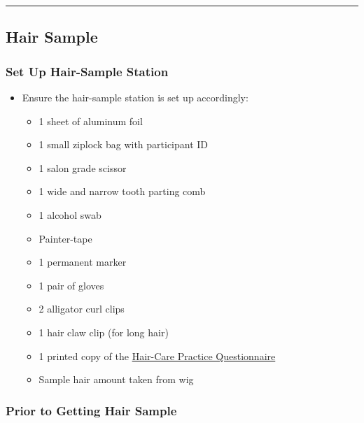 \documentclass[]{book}
\providecommand{\tightlist}{%
  \setlength{\itemsep}{0pt}\setlength{\parskip}{0pt}}
\begin{document}
\begin{center}\rule{0.5\linewidth}{0.5pt}\end{center}

\hypertarget{hair-sample}{%
\subsection{Hair Sample}\label{hair-sample}}

\hypertarget{set-up-hair-sample-station}{%
\subsubsection{Set Up Hair-Sample Station}\label{set-up-hair-sample-station}}

\begin{itemize}
\tightlist
\item
  Ensure the hair-sample station is set up accordingly:

  \begin{itemize}
  \tightlist
  \item
    1 sheet of aluminum foil
  \item
    1 small ziplock bag with participant ID
  \item
    1 salon grade scissor
  \item
    1 wide and narrow tooth parting comb
  \item
    1 alcohol swab
  \item
    Painter-tape
  \item
    1 permanent marker
  \item
    1 pair of gloves
  \item
    2 alligator curl clips
  \item
    1 hair claw clip (for long hair)
  \item
    1 printed copy of the \href{https://app.box.com/file/630323877918}{Hair-Care Practice Questionnaire}
  \item
    Sample hair amount taken from wig
  \end{itemize}
\end{itemize}

\hypertarget{prior-to-getting-hair-sample}{%
\subsubsection{Prior to Getting Hair Sample}\label{prior-to-getting-hair-sample}}
\end{document}
